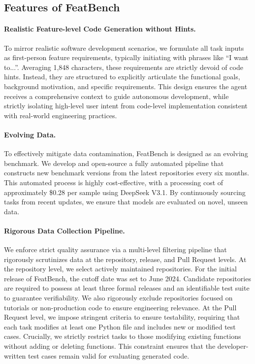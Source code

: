 \subsection{Features of FeatBench}

\paragraph{\textbf{Realistic Feature-level Code Generation without Hints.}} To mirror realistic software development scenarios, we formulate all task inputs as first-person feature requirements, typically initiating with phrases like ``I want to...''. Averaging 1,848 characters, these requirements are strictly devoid of code hints. Instead, they are structured to explicitly articulate the functional goals, background motivation, and specific requirements. This design ensures the agent receives a comprehensive context to guide autonomous development, while strictly isolating high-level user intent from code-level implementation consistent with real-world engineering practices.

\paragraph{\textbf{Evolving Data.}} To effectively mitigate data contamination, FeatBench is designed as an evolving benchmark. We develop and open-source a fully automated pipeline that constructs new benchmark versions from the latest repositories every six months. This automated process is highly cost-effective, with a processing cost of approximately \$0.28 per sample using DeepSeek V3.1. By continuously sourcing tasks from recent updates, we ensure that models are evaluated on novel, unseen data.

\paragraph{\textbf{Rigorous Data Collection Pipeline.}} We enforce strict quality assurance via a multi-level filtering pipeline that rigorously scrutinizes data at the repository, release, and Pull Request levels. At the repository level, we select actively maintained repositories. For the initial release of FeatBench, the cutoff date was set to June 2024. Candidate repositories are required to possess at least three formal releases and an identifiable test suite to guarantee verifiability. We also rigorously exclude repositories focused on tutorials or non-production code to ensure engineering relevance. At the Pull Request level, we impose stringent criteria to ensure testability, requiring that each task modifies at least one Python file and includes new or modified test cases. Crucially, we strictly restrict tasks to those modifying existing functions without adding or deleting functions. This constraint ensures that the developer-written test cases remain valid for evaluating generated code.

